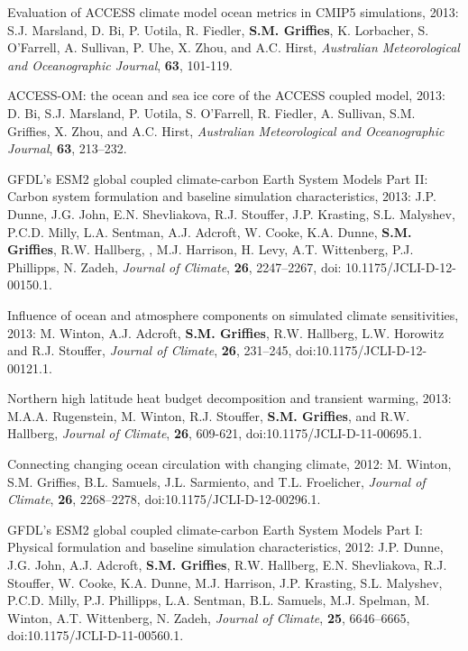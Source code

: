 \begin{etaremune}
\item Evaluation of ACCESS climate model ocean metrics in CMIP5
  simulations, 2013: S.J. Marsland, D. Bi, P. Uotila, R. Fiedler, {\bf
    S.M. Grif\/f\/ies}, K. Lorbacher, S. O'Farrell, A. Sullivan,
  P. Uhe, X. Zhou, and A.C. Hirst, {\it Australian Meteorological and
    Oceanographic Journal}, {\bf 63}, 101-119.

\item ACCESS-OM: the ocean and sea ice core of the ACCESS coupled
  model, 2013: D. Bi, S.J. Marsland, P. Uotila, S. O'Farrell,
  R. Fiedler, A. Sullivan, S.M. Grif\/f\/ies, X. Zhou, and
  A.C. Hirst, {\it Australian Meteorological and Oceanographic
    Journal}, {\bf 63}, 213--232.

\item GFDL’s ESM2 global coupled climate-carbon Earth System Models
  Part II: Carbon system formulation and baseline simulation
  characteristics, 2013: J.P. Dunne, J.G. John, E.N. Shevliakova,
  R.J. Stouffer, J.P. Krasting, S.L. Malyshev, P.C.D. Milly,
  L.A. Sentman, A.J. Adcroft, W. Cooke, K.A. Dunne, {\bf
    S.M. Grif\/f\/ies}, R.W. Hallberg, , M.J. Harrison, H. Levy,
  A.T. Wittenberg, P.J. Phillipps, N. Zadeh, {\it Journal of Climate},
  {\bf 26}, 2247--2267, doi: 10.1175/JCLI-D-12-00150.1.

\item Influence of ocean and atmosphere components on simulated
  climate sensitivities, 2013: M. Winton, A.J. Adcroft, {\bf
    S.M. Grif\/f\/ies}, R.W. Hallberg, L.W. Horowitz and
  R.J. Stouffer, {\it Journal of Climate}, {\bf 26}, 231--245,
  doi:10.1175/JCLI-D-12-00121.1.

\item Northern high latitude heat budget decomposition and transient
  warming, 2013: M.A.A. Rugenstein, M. Winton, R.J. Stouffer, {\bf
    S.M. Grif\/f\/ies}, and R.W. Hallberg, {\it Journal of Climate}, {\bf 26}, 609-621, doi:10.1175/JCLI-D-11-00695.1.

\item Connecting changing ocean circulation with changing climate,
  2012: M. Winton, S.M. Grif\/f\/ies, B.L. Samuels,
  J.L. Sarmiento, and T.L. Froelicher, {\it Journal of Climate}, {\bf 26}, 2268--2278, doi:10.1175/JCLI-D-12-00296.1.

\item GFDL’s ESM2 global coupled climate-carbon Earth System Models
  Part I: Physical formulation and baseline simulation
  characteristics, 2012: J.P. Dunne, J.G. John, A.J. Adcroft, {\bf
    S.M. Grif\/f\/ies}, R.W. Hallberg, E.N. Shevliakova, R.J. Stouffer,
  W. Cooke, K.A. Dunne, M.J. Harrison, J.P. Krasting, S.L. Malyshev,
  P.C.D. Milly, P.J. Phillipps, L.A. Sentman, B.L. Samuels,
  M.J. Spelman, M. Winton, A.T. Wittenberg, N. Zadeh, {\it Journal of
    Climate}, {\bf 25}, 6646--6665,
doi:10.1175/JCLI-D-11-00560.1.


\end{etaremune}
